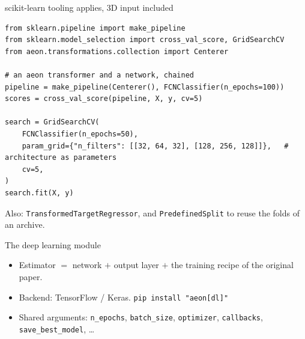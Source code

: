 \documentclass[aspectratio=169,10pt]{beamer}
\begin{document}
\begin{frame}[fragile]{scikit-learn tooling applies, 3D input included}
\begin{lstlisting}
from sklearn.pipeline import make_pipeline
from sklearn.model_selection import cross_val_score, GridSearchCV
from aeon.transformations.collection import Centerer

# an aeon transformer and a network, chained
pipeline = make_pipeline(Centerer(), FCNClassifier(n_epochs=100))
scores = cross_val_score(pipeline, X, y, cv=5)

search = GridSearchCV(
    FCNClassifier(n_epochs=50),
    param_grid={"n_filters": [[32, 64, 32], [128, 256, 128]]},   # architecture as parameters
    cv=5,
)
search.fit(X, y)
\end{lstlisting}
  \vspace{0.05cm}
  {\small Also: \texttt{TransformedTargetRegressor}, and \texttt{PredefinedSplit} to reuse the folds of an archive.}
\end{frame}

\begin{frame}{The deep learning module}
  \centering
  \vspace{0.3cm}
  \begin{itemize}
    \item Estimator $=$ network $+$ output layer $+$ the training recipe of the original paper.
    \item Backend: TensorFlow / Keras. \quad \texttt{pip install "aeon[dl]"}
    \item Shared arguments: \texttt{n\_epochs}, \texttt{batch\_size}, \texttt{optimizer}, \texttt{callbacks}, \texttt{save\_best\_model}, \dots
  \end{itemize}
\end{frame}
\end{document}
